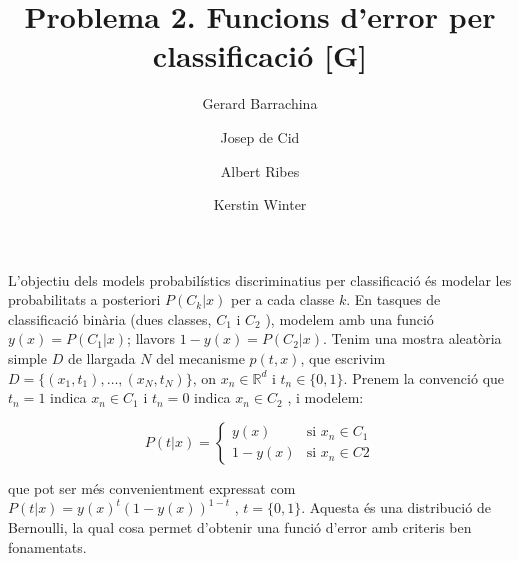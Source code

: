 \documentclass[a4paper]{article}
\author{
Gerard Barrachina \and
Josep de Cid \and
Albert Ribes \and
Kerstin Winter
}
\title{
Problema 2. Funcions d'error per classificació [G]
}
\begin{document}
\maketitle

L'objectiu dels models probabilístics discriminatius per classificació és modelar les probabilitats a posteriori $P(C_k |x)$ per a cada classe $k$. En tasques de classificació binària (dues classes, $C_1$ i $C_2$ ), modelem
amb una funció $y(x) = P(C_1 |x)$; llavors $1 - y(x) = P(C_2 |x)$. Tenim una mostra aleatòria simple $D$ de
llargada $N$ del mecanisme $p(t, x)$, que escrivim $D = \{(x_1 , t_1 ), \dots, (x_N , t_N )\}$, on $x_n \in \mathbb{R}^d$ i $t_n \in \{ 0, 1\}$.
Prenem la convenció que $t_n = 1$ indica $x_n \in C_1$ i $t_n = 0$ indica $x_n \in C_2$ , i modelem:

\begin{equation*}
 P(t|x) =
 \begin{cases}
  y(x)     & \text{si } x_n \in C_1 \\
  1 - y(x) & \text{si } x_n \in C2
 \end{cases}
\end{equation*}

que pot ser més convenientment expressat com $P(t|x) = y(x)^t (1 - y(x))^{1-t}$ , $t = \{ 0, 1\}$. Aquesta és una
distribució de Bernoulli, la qual cosa permet d'obtenir una funció d'error amb criteris ben fonamentats.
\end{document}
